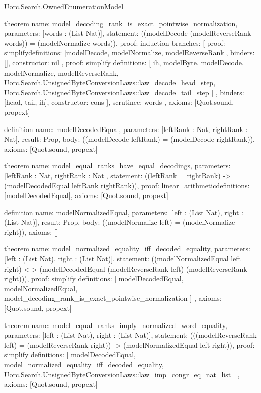 \begin{lexlean}{Uorc.Search.OwnedEnumerationModel}
\begin{semanticmodule}
theorem{
  name: model_decoding_rank_is_exact_pointwise_normalization,
  parameters: [words : (List Nat)],
  statement: ((modelDecode (modelReverseRank words)) = (modelNormalize words)),
  proof: induction{
    branches: [
      {
        proof: simplify{definitions: [modelDecode, modelNormalize, modelReverseRank]},
        binders: [],
        constructor: nil
      },
      {
        proof: simplify{
          definitions: [
            ih,
            modelByte,
            modelDecode,
            modelNormalize,
            modelReverseRank,
            Uorc.Search.UnsignedByteConversionLaws::law_decode_head_step,
            Uorc.Search.UnsignedByteConversionLaws::law_decode_tail_step
          ]
        },
        binders: [head, tail, ih],
        constructor: cons
      }
    ],
    scrutinee: words
  },
  axioms: [Quot.sound, propext]
}

definition{
  name: modelDecodedEqual,
  parameters: [leftRank : Nat, rightRank : Nat],
  result: Prop,
  body: ((modelDecode leftRank) = (modelDecode rightRank)),
  axioms: [Quot.sound, propext]
}

theorem{
  name: model_equal_ranks_have_equal_decodings,
  parameters: [leftRank : Nat, rightRank : Nat],
  statement: ((leftRank = rightRank) -> (modelDecodedEqual leftRank rightRank)),
  proof: linear_arithmetic{definitions: [modelDecodedEqual]},
  axioms: [Quot.sound, propext]
}

definition{
  name: modelNormalizedEqual,
  parameters: [left : (List Nat), right : (List Nat)],
  result: Prop,
  body: ((modelNormalize left) = (modelNormalize right)),
  axioms: []
}

theorem{
  name: model_normalized_equality_iff_decoded_equality,
  parameters: [left : (List Nat), right : (List Nat)],
  statement: ((modelNormalizedEqual left right) <-> (modelDecodedEqual (modelReverseRank left) (modelReverseRank right))),
  proof: simplify{
    definitions: [
      modelDecodedEqual,
      modelNormalizedEqual,
      model_decoding_rank_is_exact_pointwise_normalization
    ]
  },
  axioms: [Quot.sound, propext]
}

theorem{
  name: model_equal_ranks_imply_normalized_word_equality,
  parameters: [left : (List Nat), right : (List Nat)],
  statement: (((modelReverseRank left) = (modelReverseRank right)) -> (modelNormalizedEqual left right)),
  proof: simplify{
    definitions: [
      modelDecodedEqual,
      model_normalized_equality_iff_decoded_equality,
      Uorc.Search.UnsignedByteConversionLaws::law_imp_congr_eq_nat_list
    ]
  },
  axioms: [Quot.sound, propext]
}


\end{semanticmodule}
\end{lexlean}
